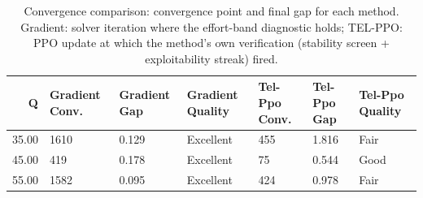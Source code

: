 \begin{table}[htbp]
\centering
\caption{Convergence comparison: convergence point and final gap for each method. Gradient: solver iteration where the effort-band diagnostic holds; TEL-PPO: PPO update at which the method's own verification (stability screen + exploitability streak) fired.}
\label{tab:convergence_comparison}
\begin{tabular}{rllllll}
\toprule
Q & Gradient Conv. & Gradient Gap & Gradient Quality & Tel-Ppo Conv. & Tel-Ppo Gap & Tel-Ppo Quality \\
\midrule
35.00 & 1610 & 0.129 & Excellent & 455 & 1.816 & Fair \\
45.00 & 419 & 0.178 & Excellent & 75 & 0.544 & Good \\
55.00 & 1582 & 0.095 & Excellent & 424 & 0.978 & Fair \\
\bottomrule
\end{tabular}

\end{table}
